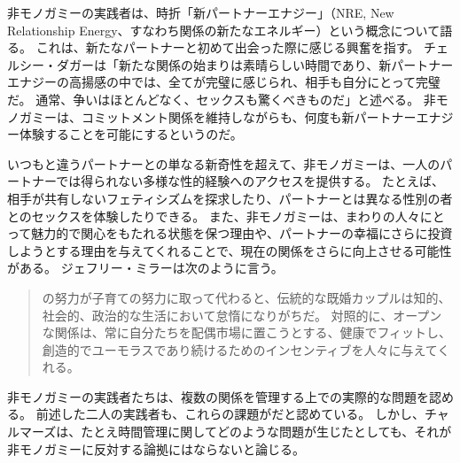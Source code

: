\documentclass[paper=a4,book,openany]{jlreq}
\newcommand{\ig}[1]{}           %
\begin{document}
非モノガミーの実践者は、時折「新パートナーエナジー」（NRE, New Relationship Energy、すなわち関係の新たなエネルギー）という概念について語る。
これは、新たなパートナーと初めて出会った際に感じる興奮を指す。
チェルシー・ダガーは「新たな関係の始まりは素晴らしい時間であり、新パートナーエナジーの高揚感の中では、全てが完璧に感じられ、相手も自分にとって完璧だ。
通常、争いはほとんどなく、セックスも驚くべきものだ」と述べる\citep{dagger18:_weve_all_been_there}。
非モノガミーは、コミットメント関係を維持しながらも、何度も新パートナーエナジー体験することを可能にするというのだ。

いつもと違うパートナーとの単なる新奇性を超えて、非モノガミーは、一人のパートナーでは得られない多様な性的経験へのアクセスを提供する。
たとえば、相手が共有しないフェティシズムを探求したり、パートナーとは異なる性別の者とのセックスを体験したりできる。
また、非モノガミーは、まわりの人々にとって魅力的で関心をもたれる状態を保つ理由や、パートナーの幸福にさらに投資しようとする理由を与えてくれることで、現在の関係をさらに向上させる可能性がある。
ジェフリー・ミラー\ig{Geoffrey Miller}は次のように言う。

\begin{quote}
の努力が子育ての努力に取って代わると、伝統的な既婚カップルは知的、社会的、政治的な生活において怠惰になりがちだ。
対照的に、オープンな関係は、常に自分たちを配偶市場に置こうとする、健康でフィットし、創造的でユーモラスであり続けるためのインセンティブを人々に与えてくれる。
\citep{miller19:_polyam_is_growin}

\end{quote}

非モノガミーの実践者たちは、複数の関係を管理する上での実際的な問題を認める。
前述した二人の実践者も、これらの課題がだと認めている。
しかし、チャルマーズは、たとえ時間管理に関してどのような問題が生じたとしても、それが非モノガミーに反対する論拠にはならないと論じる。
\end{document}
